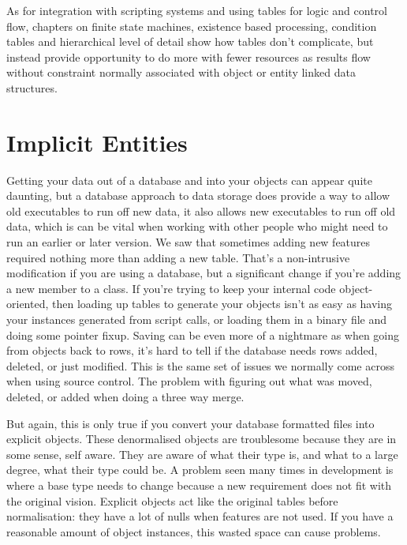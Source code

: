 As for integration with scripting systems and using tables for logic and
control flow, chapters on finite state machines, existence based processing,
condition tables and hierarchical level of detail show how tables don't
complicate, but instead provide opportunity to do more with fewer resources as
results flow without constraint normally associated with object or entity
linked data structures.

\section{Implicit Entities}

Getting your data out of a database and into your objects can appear quite
daunting, but a database approach to data storage does provide a way to allow
old executables to run off new data, it also allows new executables to run off
old data, which is can be vital when working with other people who might need
to run an earlier or later version. We saw that sometimes adding new features
required nothing more than adding a new table. That's a non-intrusive
modification if you are using a database, but a significant change if you're
adding a new member to a class.  If you're trying to keep your internal code
object-oriented, then loading up tables to generate your objects isn't as easy
as having your instances generated from script calls, or loading them in a
binary file and doing some pointer fixup. Saving can be even more of a
nightmare as when going from objects back to rows, it's hard to tell if the
database needs rows added, deleted, or just modified.  This is the same set of
issues we normally come across when using source control. The problem with
figuring out what was moved, deleted, or added when doing a three way merge.

But again, this is only true if you convert your database formatted files into
explicit objects. These denormalised objects are troublesome because they are
in some sense, self aware. They are aware of what their type is, and what to a
large degree, what their type could be. A problem seen many times in
development is where a base type needs to change because a new requirement does
not fit with the original vision. Explicit objects act like the original tables
before normalisation: they have a lot of nulls when features are not used. If
you have a reasonable amount of object instances, this wasted space can cause
problems.

